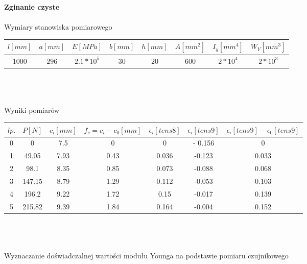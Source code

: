 \documentclass[11pt]{article}
\begin{document}
\textbf{Zginanie czyste}\\\\
Wymiary stanowiska pomiarowego\\
\begin{tabular}{|c|c|c|c|c|c|c|c|}
\hline
$l[mm]$ & $a[mm]$ & $E[MPa]$ & $b[mm]$ & $h[mm]$ & $A[mm^2]$ & $I_y[mm^4]$ & $W_Y[mm^3]$\\ \hline
1000 & $296$ & $2.1*10^5$ & $30$ & $20$ & $600$ & $2*10^4$ & $2*10^3$\\ \hline
\end{tabular}
\\\\\\
Wyniki pomiarów\\
\begin{tabular}{|c|c|c|c|c|c|c|}\hline
$lp.$ & $P[N]$ & $c_i[mm]$ & $f_c = c_i - c_0[mm]$ & $\epsilon_i[tens 8]$ & $\epsilon_i[tens 9]$ & $\epsilon_i[tens9] - \epsilon_0[tens9]$\\ \hline
0 & 0 & 7.5 & 0 & 0 & - 0.156 & 0\\ \hline
1 & 49.05 & 7.93 & 0.43 & 0.036 & -0.123 & 0.033\\ \hline
2 & 98.1 & 8.35 & 0.85 & 0.073 & -0.088 & 0.068\\ \hline
3 & 147.15 & 8.79 & 1.29 & 0.112 & -0.053 & 0.103\\ \hline
4 & 196.2 & 9.22 & 1.72 & 0.15 & -0.017 & 0.139\\ \hline
5 & 215.82 & 9.39 & 1.84 & 0.164 & -0.004 & 0.152\\ \hline
\end{tabular}
\\\\\\
Wyznaczanie doświadczalnej wartości modułu Younga na podstawie pomiaru czujnikowego\\
\end{document}
